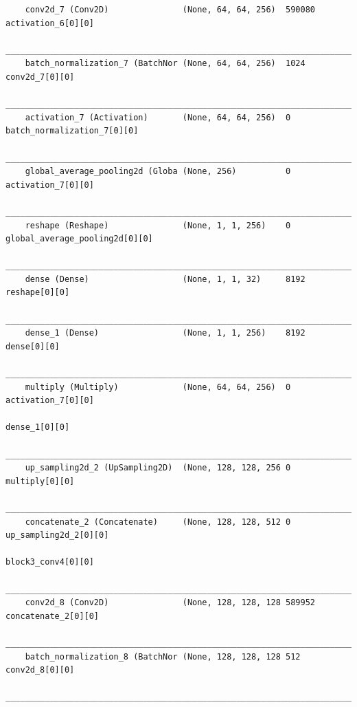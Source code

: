{\begin{verbatim}
    conv2d_7 (Conv2D)               (None, 64, 64, 256)  590080      activation_6[0][0]               
    __________________________________________________________________________________________________
    batch_normalization_7 (BatchNor (None, 64, 64, 256)  1024        conv2d_7[0][0]                   
    __________________________________________________________________________________________________
    activation_7 (Activation)       (None, 64, 64, 256)  0           batch_normalization_7[0][0]      
    __________________________________________________________________________________________________
    global_average_pooling2d (Globa (None, 256)          0           activation_7[0][0]               
    __________________________________________________________________________________________________
    reshape (Reshape)               (None, 1, 1, 256)    0           global_average_pooling2d[0][0]   
    __________________________________________________________________________________________________
    dense (Dense)                   (None, 1, 1, 32)     8192        reshape[0][0]                    
    __________________________________________________________________________________________________
    dense_1 (Dense)                 (None, 1, 1, 256)    8192        dense[0][0]                      
    __________________________________________________________________________________________________
    multiply (Multiply)             (None, 64, 64, 256)  0           activation_7[0][0]               
                                                                        dense_1[0][0]                    
    __________________________________________________________________________________________________
    up_sampling2d_2 (UpSampling2D)  (None, 128, 128, 256 0           multiply[0][0]                   
    __________________________________________________________________________________________________
    concatenate_2 (Concatenate)     (None, 128, 128, 512 0           up_sampling2d_2[0][0]            
                                                                        block3_conv4[0][0]               
    __________________________________________________________________________________________________
    conv2d_8 (Conv2D)               (None, 128, 128, 128 589952      concatenate_2[0][0]              
    __________________________________________________________________________________________________
    batch_normalization_8 (BatchNor (None, 128, 128, 128 512         conv2d_8[0][0]                   
    __________________________________________________________________________________________________

\end{verbatim}}
